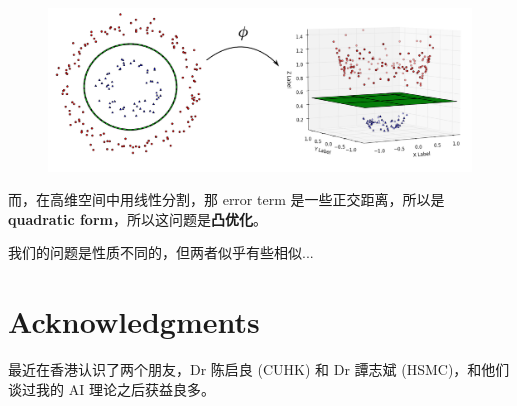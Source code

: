 \documentclass[12pt]{article}
\begin{document}
\begin{figure}[H]
\centering
\includegraphics[scale=0.6]{kernel-trick.png}
\end{figure}

而，在高维空间中用线性分割，那 error term 是一些正交距离，所以是 \textbf{quadratic form}，所以这问题是\textbf{凸优化}。


我们的问题是性质不同的，但两者似乎有些相似... 

\section*{Acknowledgments}

最近在香港认识了两个朋友，Dr 陈启良 (CUHK) 和 Dr 譚志斌 (HSMC)，和他们谈过我的 AI 理论之后获益良多。




\end{document}
